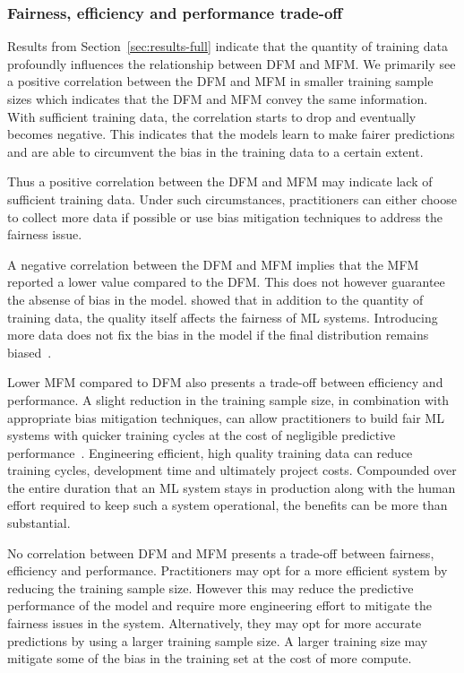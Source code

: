 \documentclass{article}
\begin{document}
\subsubsection{Fairness, efficiency and performance trade-off}\label{sec:discuss-fair-eff-perf-trade}

Results from Section \ref{sec:results-full} indicate that the quantity
of training data profoundly influences the relationship between DFM
and MFM. We primarily see a positive correlation between the DFM and
MFM in smaller training sample sizes which indicates that the DFM and
MFM convey the same information. With sufficient training data, the
correlation starts to drop and eventually becomes negative. This
indicates that the models learn to make fairer predictions and are
able to circumvent the bias in the training data to a certain extent.

Thus a positive correlation between the DFM and MFM may indicate lack
of sufficient training data. Under such circumstances, practitioners
can either choose to collect more data if possible or use bias
mitigation techniques to address the fairness issue.

A negative correlation between the DFM and MFM implies that the MFM
reported a lower value compared to the DFM. This does not however
guarantee the absense of bias in the
model. \citeauthor{zhang2021ignorance} showed that in addition to the
quantity of training data, the quality itself affects the fairness of
ML systems. Introducing more data does not fix the bias in the model
if the final distribution remains biased \cite{zhang2021ignorance}.

Lower MFM compared to DFM also presents a trade-off between efficiency
and performance. A slight reduction in the training sample size, in
combination with appropriate bias mitigation techniques, can allow
practitioners to build fair ML systems with quicker training cycles at
the cost of negligible predictive
performance \cite{verdecchia2022data}. Engineering efficient, high
quality training data can reduce training cycles, development time and
ultimately project costs. Compounded over the entire duration that an
ML system stays in production along with the human effort required to
keep such a system operational, the benefits can be more than
substantial.

No correlation between DFM and MFM presents a trade-off between
fairness, efficiency and performance. Practitioners may opt for a more
efficient system by reducing the training sample size. However this
may reduce the predictive performance of the model and require more
engineering effort to mitigate the fairness issues in the system.
Alternatively, they may opt for more accurate predictions by using a
larger training sample size. A larger training size may mitigate some
of the bias in the training set at the cost of more compute.
\end{document}
